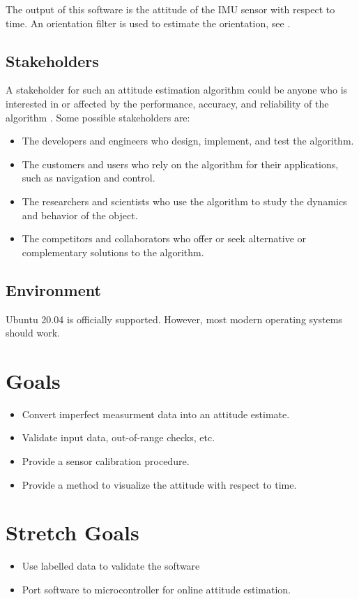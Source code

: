\documentclass{article}
\begin{document}
The output of this software is the attitude of the IMU sensor with respect to time. An orientation filter is used to estimate the orientation, see \cite{al-jlailaty_efficient_2020}.


\subsection{Stakeholders}

A stakeholder for such an attitude estimation algorithm could be anyone who is interested in or
affected by the performance, accuracy, and reliability of the algorithm \cite{stake}. Some possible
stakeholders are:

\begin{itemize}
    \item The developers and engineers who design, implement, and test the algorithm.
    \item The customers and users who rely on the algorithm for their applications, such as
    navigation and control.
    \item The researchers and scientists who use the algorithm to study the dynamics and behavior of
    the object.
    \item The competitors and collaborators who offer or seek alternative or complementary solutions
    to the algorithm.
\end{itemize}
    

\subsection{Environment}

Ubuntu 20.04 is officially supported. However, most modern operating systems should work.

\section{Goals}

\begin{itemize}
    \item Convert imperfect measurment data into an attitude estimate.
    \item Validate input data, out-of-range checks, etc.
    \item Provide a sensor calibration procedure.
    \item Provide a method to visualize the attitude with respect to time.
\end{itemize}

\section{Stretch Goals}

\begin{itemize}
    \item Use labelled data to validate the software
    \item Port software to microcontroller for online attitude estimation.
\end{itemize}

{}

\end{document}
